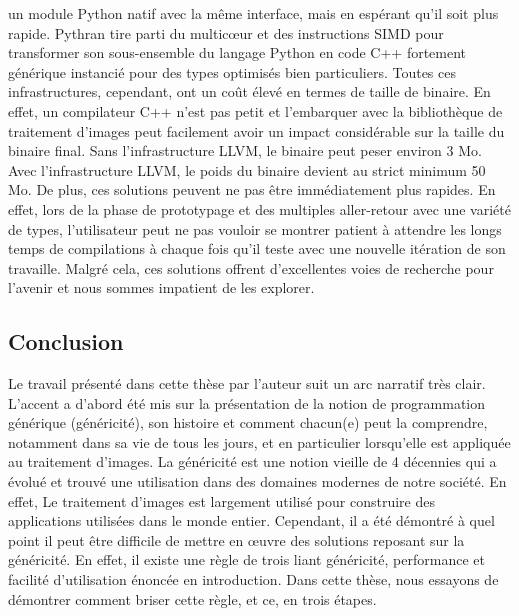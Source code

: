 un module Python natif avec la même interface, mais en espérant qu'il soit plus rapide. Pythran tire parti du
multic\oe{}ur et des instructions SIMD pour transformer son sous-ensemble du langage Python en code C++ fortement
générique instancié pour des types optimisés bien particuliers. Toutes ces infrastructures, cependant, ont un coût élevé
en termes de taille de binaire. En effet, un compilateur C++ n'est pas petit et l'embarquer avec la bibliothèque de
traitement d'images peut facilement avoir un impact considérable sur la taille du binaire final. Sans l'infrastructure
LLVM, le binaire peut peser environ 3 Mo. Avec l'infrastructure LLVM, le poids du binaire devient au strict minimum 50
Mo. De plus, ces solutions peuvent ne pas être immédiatement plus rapides. En effet, lors de la phase de prototypage et
des multiples aller-retour avec une variété de types, l'utilisateur peut ne pas vouloir se montrer patient à attendre
les longs temps de compilations à chaque fois qu'il teste avec une nouvelle itération de son travaille. Malgré cela, ces
solutions offrent d'excellentes voies de recherche pour l'avenir et nous sommes impatient de les explorer.


\subsection*{Conclusion}


Le travail présenté dans cette thèse par l'auteur suit un arc narratif très clair. L'accent a d'abord été mis sur la
présentation de la notion de programmation générique (généricité), son histoire et comment chacun(e) peut la comprendre,
notamment dans sa vie de tous les jours, et en particulier lorsqu'elle est appliquée au traitement d'images. La
généricité est une notion vieille de 4 décennies qui a évolué et trouvé une utilisation dans des domaines modernes de
notre société. En effet, Le traitement d'images est largement utilisé pour construire des applications utilisées dans le
monde entier. Cependant, il a été démontré à quel point il peut être difficile de mettre en \oe{}uvre des solutions
reposant sur la généricité. En effet, il existe une règle de trois liant généricité, performance et facilité
d'utilisation énoncée en introduction. Dans cette thèse, nous essayons de démontrer comment briser cette règle, et ce,
en trois étapes.

